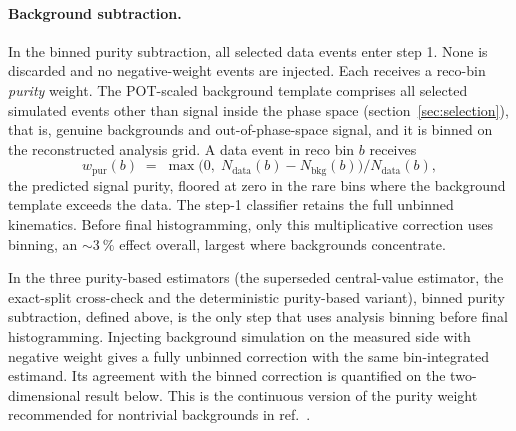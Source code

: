 \paragraph{Background subtraction.} In the binned purity subtraction, all selected data events enter step 1. None is discarded and no negative-weight events are injected. Each receives a reco-bin \emph{purity} weight. The POT-scaled background template comprises all selected simulated events other than signal inside the phase space (section~\ref{sec:selection}), that is, genuine backgrounds and out-of-phase-space signal, and it is binned on the reconstructed analysis grid. A data event in reco bin $b$ receives
\begin{equation*}
  w_{\mathrm{pur}}(b) \;=\;
  \max\!\bigl(0,\; N_{\mathrm{data}}(b) - N_{\mathrm{bkg}}(b)\bigr)
  \big/ N_{\mathrm{data}}(b),
\end{equation*}
the predicted signal purity, floored at zero in the rare bins where the background template exceeds the data. The step-1 classifier retains the full unbinned kinematics. Before final histogramming, only this multiplicative correction uses binning, an ${\sim}\SI{3}{\percent}$ effect overall, largest where backgrounds concentrate.

\label{app:negweight}
In the three purity-based estimators (the superseded central-value estimator, the exact-split cross-check and the deterministic purity-based variant), binned purity subtraction, defined above, is the only step that uses analysis binning before final histogramming. Injecting background simulation on the measured side with negative weight gives a fully unbinned correction with the same bin-integrated estimand. Its agreement with the binned correction is quantified on the two-dimensional result below. This is the continuous version of the purity weight recommended for nontrivial backgrounds in ref.~\cite{Canelli:2025guide}.

